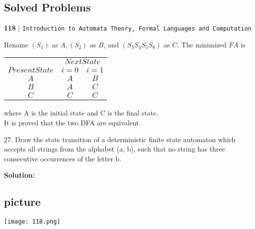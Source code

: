 \documentclass[a4,9pt]{beamer}
\begin{document}
\begin{frame}
\section*{Solved Problems}
\begin{flushleft}
    \textbf{118}\hspace*{0.1cm} \textbf{$|$} \hspace*{0.1cm} \texttt{Introduction to Automata Theory, Formal Languages and Computation}
  \end{flushleft}
  \vspace*{0.5cm}

  Rename $(S_1)$ as $A, (S_2)$ as $B$, and $(S_3 S_4 S_5 S_6)$ as $C$. The minimized $FA$ is\\

  \vspace*{0.2cm}
  \begin{center}
\begin{tabular}{ccc}
 \hline

 \hline

 \hline

 \hline
 & \multicolumn{2}{c}{$Next State$}\\
 \cline{2-3}
 $Present State$ &  $i=0$ & $i=1$\\
\hline
 $A$   &   $A$      &  $B$ \\
 $B$   &   $A$      &  $C$   \\
 $C$   &   $C$      &  $C$   \\
 \hline

 \hline

 \hline

 \hline
\end{tabular}
\end{center}

\vspace*{0.2cm}
where A is the initial state and C is the final state.\\
 \hspace*{0.5cm} It is proved that the two DFA are equivalent.\\
\end{frame}

\begin{frame}
27. Draw the state transition of a deterministic finite state automaton which accepts all strings from
the alphabet (a, b), such that no string has three consecutive occurrences of the letter b.\\
\begin{flushright}
  [GATE 1993]
\end{flushright}

\pause
\textbf{Solution:}\\

\begin{center}
\section{picture}
\texttt{[image: 118.png]}
\end{center}
\end{frame}
\end{document}
